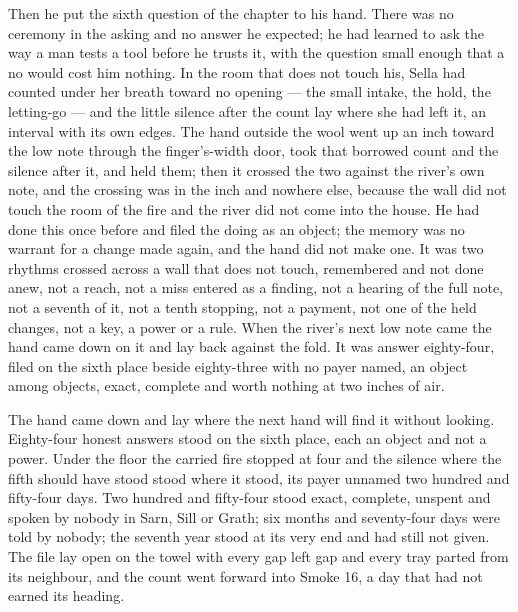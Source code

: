 Then he put the sixth question of the chapter to his hand. There was no ceremony in the asking and no answer he expected; he had learned to ask the way a man tests a tool before he trusts it, with the question small enough that a no would cost him nothing. In the room that does not touch his, Sella had counted under her breath toward no opening --- the small intake, the hold, the letting-go --- and the little silence after the count lay where she had left it, an interval with its own edges. The hand outside the wool went up an inch toward the low note through the finger's-width door, took that borrowed count and the silence after it, and held them; then it crossed the two against the river's own note, and the crossing was in the inch and nowhere else, because the wall did not touch the room of the fire and the river did not come into the house. He had done this once before and filed the doing as an object; the memory was no warrant for a change made again, and the hand did not make one. It was two rhythms crossed across a wall that does not touch, remembered and not done anew, not a reach, not a miss entered as a finding, not a hearing of the full note, not a seventh of it, not a tenth stopping, not a payment, not one of the held changes, not a key, a power or a rule. When the river's next low note came the hand came down on it and lay back against the fold. It was answer eighty-four, filed on the sixth place beside eighty-three with no payer named, an object among objects, exact, complete and worth nothing at two inches of air.

The hand came down and lay where the next hand will find it without looking. Eighty-four honest answers stood on the sixth place, each an object and not a power. Under the floor the carried fire stopped at four and the silence where the fifth should have stood stood where it stood, its payer unnamed two hundred and fifty-four days. Two hundred and fifty-four stood exact, complete, unspent and spoken by nobody in Sarn, Sill or Grath; six months and seventy-four days were told by nobody; the seventh year stood at its very end and had still not given. The file lay open on the towel with every gap left gap and every tray parted from its neighbour, and the count went forward into Smoke 16, a day that had not earned its heading.
